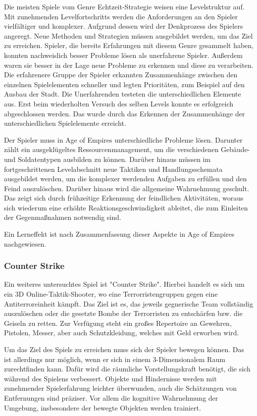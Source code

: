 Die meisten Spiele vom Genre Echtzeit-Strategie weisen eine Levelstruktur auf. Mit zunehmenden Levelfortschritts werden die Anforderungen an den Spieler vielfältiger und komplexer. Aufgrund dessen wird der Denkprozess des Spielers angeregt. Neue Methoden und Strategien müssen ausgebildet werden, um das Ziel zu erreichen. Spieler, die bereits Erfahrungen mit diesem Genre gesammelt haben, konnten nachweislich besser Probleme lösen als unerfahrene Spieler. Außerdem waren sie besser in der Lage neue Probleme zu erkennen und diese zu verarbeiten. Die erfahrenere Gruppe der Spieler erkannten Zusammenhänge zwischen den einzelnen Spielelementen schneller und legten Prioritäten, zum Beispiel auf den Ausbau der Stadt. Die Unerfahrenden testeten die unterschiedlichen Elemente aus. Erst beim wiederholten Versuch des selben Levels konnte es erfolgreich abgeschlossen werden. Das wurde durch das Erkennen der Zusammenhänge der unterschiedlichen Spielelemente erreicht.

Der Spieler muss in Age of Empires unterschiedliche Probleme lösen. Darunter zählt ein ausgeklügeltes Ressourcenmanagement, um die verschiedenen Gebäude- und Soldatentypen ausbilden zu können. Darüber hinaus müssen im fortgeschrittenen Levelabschnitt neue Taktiken und Handlungsschemata ausgebildet werden, um die komplexer werdenden Aufgaben zu erfüllen und den Feind auszulöschen. Darüber hinaus wird die allgemeine Wahrnehmung geschult. Das zeigt sich durch frühzeitige Erkennung der feindlichen Aktivitäten, woraus sich wiederum eine erhöhte Reaktionsgeschwindigkeit ableitet, die zum Einleiten der Gegenmaßnahmen notwendig sind. 

Ein Lerneffekt ist nach Zusammenfassung dieser Aspekte in Age of Empires nachgewiesen.

\subsubsection{Counter Strike}
Ein weiteres untersuchtes Spiel ist "{}Counter Strike"{}. Hierbei handelt es sich um ein 3D Online-Taktik-Shooter, wo eine Terrorristengruppen gegen eine Antiterroreinheit kämpft. Das Ziel ist es, das jeweils gegnerische Team vollständig auszulöschen oder die gesetzte Bombe der Terrorristen zu entschärfen bzw. die Geiseln zu retten. Zur Verfügung steht ein großes Repertoire an Gewehren, Pistolen, Messer, aber auch Schutzkleidung, welches mit Geld erworben wird.

Um das Ziel des Spiels zu erreichen muss sich der Spieler bewegen können. Das ist allerdings nur möglich, wenn er sich in einem 3-Dimensionalem Raum zurechtfinden kann. Dafür wird die räumliche Vorstellungskraft benötigt, die sich während des Spielens verbessert. Objekte und Hindernisse werden mit zunehmender Spielerfahrung leichter überwunden, auch die Schätzungen von Entfernungen sind präziser. Vor allem die kognitive Wahrnehmung der Umgebung, insbesondere der bewegte Objekten werden trainiert. 

